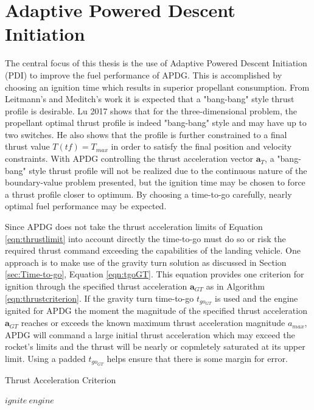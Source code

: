 \section{Adaptive Powered Descent Initiation} \label{sec:PDI}
The central focus of this thesis is the use of Adaptive Powered Descent Initiation (PDI) to improve the fuel performance of APDG. This is accomplished by choosing an ignition time which results in superior propellant consumption. From Leitmann's\:\cite{LEITMANN} and Meditch's\:\cite{MEDITCH} work it is expected that a "bang-bang" style thrust profile is desirable. Lu 2017 \:\cite{LU} shows that for the three-dimensional problem, the propellant optimal thrust profile is indeed "bang-bang" style and may have up to two switches. He also shows that the profile is further constrained to a final thrust value $T(tf) = T_{max}$ in order to satisfy the final position and velocity constraints. With APDG controlling the thrust acceleration vector $\bm{a}_T$, a "bang-bang" style thrust profile will not be realized due to the continuous nature of the boundary-value problem presented, but the ignition time may be chosen to force a thrust profile closer to optimum. By choosing a time-to-go carefully, nearly optimal fuel performance may be expected. 

Since APDG does not take the thrust acceleration limits of Equation \ref{eqn:thrustlimit} into account directly the time-to-go must do so or risk the required thrust command exceeding the capabilities of the landing vehicle. One approach is to make use of the gravity turn solution as discussed in Section \ref{sec:Time-to-go}, Equation \ref{eqn:tgoGT}. This equation provides one criterion for ignition through the specified thrust acceleration $\bm{a}_{GT}$ as in Algorithm \ref{eqn:thrustcriterion}. If the gravity turn time-to-go $t_{go_{GT}}$ is used and the engine ignited for APDG the moment the magnitude of the specified thrust acceleration $\bm{a}_{GT}$ reaches or exceeds the known maximum thrust acceleration magnitude $a_{max}$, APDG will command a large initial thrust acceleration which may exceed the rocket's limits and the thrust will be nearly or copmletely saturated at its upper limit. Using a padded $t_{go_{GT}}$ helps ensure that there is some margin for error.

\begin{algorithm}
	\caption{Thrust Acceleration Criterion}\label{eqn:thrustcriterion}
	\begin{algorithmic}[1]
			\State $ ignite\: engine $
		\EndIf
	\end{algorithmic}
\end{algorithm}

